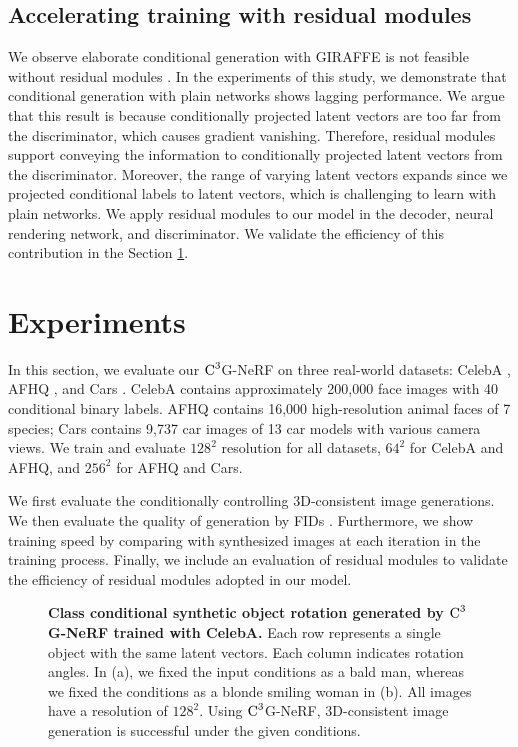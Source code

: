 \documentclass[nohyperref]{article}
\theoremstyle{plain}
\theoremstyle{definition}
\theoremstyle{remark}
\begin{document}
\subsection{Accelerating training with residual modules}
We observe elaborate conditional generation with GIRAFFE is not feasible without residual modules \cite{he2016deep, mescheder2018training}. In the experiments of this study, we demonstrate that conditional generation with plain networks shows lagging performance. We argue that this result is because conditionally projected latent vectors are too far from the discriminator, which causes gradient vanishing. Therefore, residual modules support conveying the information to conditionally projected latent vectors from the discriminator. Moreover, the range of varying latent vectors expands since we projected conditional labels to latent vectors, which is challenging to learn with plain networks. We apply residual modules to our model in the decoder, neural rendering network, and discriminator. We validate the efficiency of this contribution in the Section \ref{experiments}.


\section{Experiments}
\label{experiments}
In this section, we evaluate our $\textnormal{C}^{3}$G-NeRF on three real-world datasets: CelebA \cite{liu2015deep}, AFHQ \cite{choi2020stargan}, and Cars \cite{ashrafi_2022}. CelebA contains approximately 200,000 face images with 40 conditional binary labels. AFHQ contains 16,000 high-resolution animal faces of 7 species; Cars contains 9,737 car images of 13 car models with various camera views. We train and evaluate $128^{2}$ resolution for all datasets, $64^2$ for CelebA and AFHQ, and $256^2$ for AFHQ and Cars.

We first evaluate the conditionally controlling 3D-consistent image generations. We then evaluate the quality of generation by FIDs \cite{ttur}. Furthermore, we show training speed by comparing with synthesized images at each iteration in the training process. Finally, we include an evaluation of residual modules to validate the efficiency of residual modules adopted in our model.

\begin{figure}[t]
\begin{center}
\vskip -0.15in
\caption{\textbf{Class conditional synthetic object rotation generated by $\textnormal{C}^{3}$G-NeRF trained with CelebA.} Each row represents a single object with the same latent vectors. Each column indicates rotation angles. In (a), we fixed the input conditions as a bald man, whereas we fixed the conditions as a blonde smiling woman in (b). All images have a resolution of $128^2$. Using $\textnormal{C}^{3}$G-NeRF, 3D-consistent image generation is successful under the given conditions.}
\label{figure_3}
\end{center}
\vskip -0.2in
\end{figure}
\end{document}
